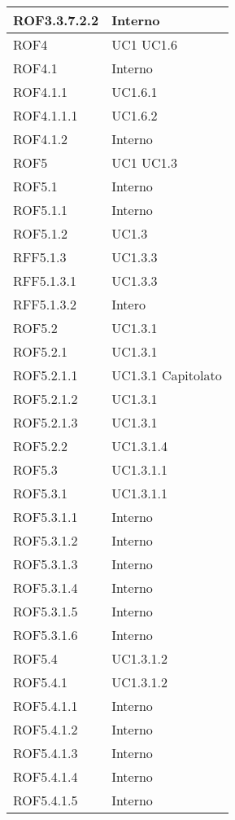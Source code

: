 \begin{center}
\begin{longtable}{| p{4cm} | p{4cm} |}
\hline
ROF3.3.7.2.2   &  Interno \\
\hline
ROF4   &  UC1 \newline UC1.6 \\
\hline
ROF4.1   &  Interno \\
\hline
ROF4.1.1   &  UC1.6.1 \\
\hline
ROF4.1.1.1   &  UC1.6.2 \\
\hline
ROF4.1.2   &  Interno \\
\hline
ROF5   &  UC1 \newline UC1.3 \\
\hline
ROF5.1   &  Interno \\
\hline
ROF5.1.1   &  Interno \\
\hline
ROF5.1.2   &  UC1.3 \\
\hline
RFF5.1.3   &  UC1.3.3 \\
\hline
RFF5.1.3.1   &  UC1.3.3 \\
\hline
RFF5.1.3.2   &  Intero \\
\hline
ROF5.2   &  UC1.3.1 \\
\hline
ROF5.2.1   &  UC1.3.1 \\
\hline
ROF5.2.1.1   &  UC1.3.1 \newline Capitolato \\
\hline
ROF5.2.1.2   &  UC1.3.1 \\
\hline
ROF5.2.1.3   &  UC1.3.1 \\
\hline
ROF5.2.2   &  UC1.3.1.4  \\
\hline
ROF5.3   &  UC1.3.1.1 \\
\hline
ROF5.3.1   &  UC1.3.1.1  \\
\hline
ROF5.3.1.1   &  Interno \\
\hline
ROF5.3.1.2   &  Interno \\
\hline
ROF5.3.1.3   &  Interno \\
\hline
ROF5.3.1.4   &  Interno \\
\hline
ROF5.3.1.5   &  Interno \\
\hline
ROF5.3.1.6   &  Interno \\
\hline
ROF5.4   &  UC1.3.1.2  \\
\hline
ROF5.4.1   &  UC1.3.1.2  \\
\hline
ROF5.4.1.1   &  Interno \\
\hline
ROF5.4.1.2   &  Interno \\
\hline
ROF5.4.1.3   &  Interno \\
\hline
ROF5.4.1.4   &  Interno \\
\hline
ROF5.4.1.5   &  Interno \\

\end{longtable}
\end{center}
